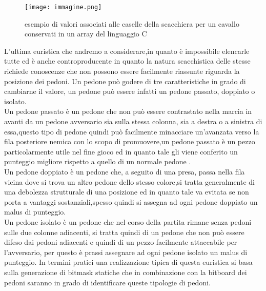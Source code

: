\begin{figure}
    \centering
    \texttt{[image: immagine.png]}
    \caption{esempio di valori associati alle caselle della scacchiera per un cavallo conservati in un array del linguaggio C}
\end{figure}

L'ultima euristica che andremo a considerare,in quanto è impossibile elencarle tutte ed è anche controproducente in quanto la natura scacchistica delle stesse richiede conoscenze che non possono essere facilmente riassunte
riguarda la posizione dei pedoni. Un pedone può godere di tre caratteristiche in grado di cambiarne il valore, un pedone può essere infatti  un pedone passato, doppiato o isolato.\\
Un pedone passato è un pedone che non può essere contrastato nella marcia in avanti da un pedone avversario sia sulla stessa colonna, sia a destra o a sinistra di essa,questo tipo di pedone quindi può facilmente 
minacciare un'avanzata verso la fila posteriore nemica con lo scopo di promuovere,un pedone passato è un pezzo particolarmente utile nel fine gioco ed in quanto tale gli viene conferito un punteggio migliore
rispetto a quello di un normale pedone .\\ 
Un pedone doppiato è un pedone che, a seguito di una presa, passa nella fila vicina dove si trova un altro pedone dello stesso colore,si tratta generalmente di una debolezza strutturale di una posizione 
ed in quanto tale va evitata se non porta a vantaggi sostanziali,spesso quindi si assegna ad ogni pedone doppiato un malus di punteggio.\\
Un pedone isolato è un pedone che nel corso della partita rimane senza pedoni sulle due colonne adiacenti, si tratta quindi di un pedone che non può essere difeso dai pedoni adiacenti e quindi di un pezzo
facilmente attaccabile per l'avversario, per questo è prassi assegnare ad ogni pedone isolato un malus di punteggio.
In termini pratici una realizzazione tipica di questa euristica si basa sulla generazione di bitmask statiche che in combinazione con la bitboard dei pedoni saranno in grado di identificare queste tipologie di pedoni.



